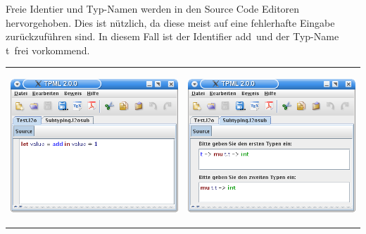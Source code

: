 {
  Freie Identier und Typ-Namen werden in den Source Code Editoren hervorgehoben.
  Dies ist nützlich, da diese meist auf eine fehlerhafte Eingabe zurückzuführen
  sind. In diesem Fall ist der Identifier \glqq add\grqq\ und der Typ-Name 
  \glqq t\grqq\ frei vorkommend.\\
  \begin{tabular}{p{12.1cm}@{}p{12.1cm}@{}}
    \begin{center}
      \includegraphics[width=11.6cm]{images/sourcecode_free_identifier.png} 
    \end{center}
    & 
    \begin{center}
      \includegraphics[width=11.6cm]{images/sourcecode_free_typename.png}
    \end{center}
  \end{tabular}
}